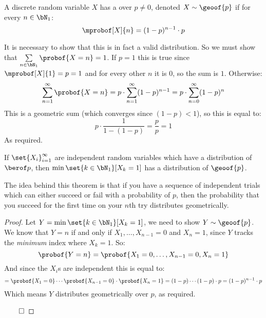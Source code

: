 \begin{defn*}

	A discrete random variable $X$ has a  over $p\neq0$,
	denoted $X\sim\geoof{p}$ if for every $n\in\bN_1$:
	\[ \mprobof[X]{n} = (1-p)^{n-1}\cdot p \]

\end{defn*}

\begin{note}

	It is necessary to show that this is in fact a valid distribution.
	So we must show that $\sum\limits_{n\in\bN_1}\probof{X=n}=1$.
	If $p=1$ this is true since $\mprobof[X]{1}=p=1$ and for every other $n$ it is $0$, so the sum is $1$.
	Otherwise:
	\[ \sum_{n=1}^\infty\probof{X=n} = p\cdot\sum_{n=1}^\infty(1-p)^{n-1} = p\cdot\sum_{n=0}^\infty(1-p)^n \]
	This is a geometric sum (which converges since $(1-p)<1$), so this is equal to:
	\[ p\cdot\frac{1}{1-(1-p)} = \frac pp = 1 \]
	As required.

\end{note}

\begin{thrm*}

	If $\set{X_i}_{i=1}^\infty$ are independent random variables which have a distribution of $\berof p$, then
	$\min\set{k\in\bN_1}[X_k=1]$ has a distribution of $\geoof{p}$.

\end{thrm*}

The idea behind this theorem is that if you have a sequence of independent trials which can either succeed or fail with a
probability of $p$, then the probability that you succeed for the first time on your $n$th try distributes geometrically.

\begin{proof}

	Let $Y=\min\set{k\in\bN_1}[X_k=1]$, we need to show $Y\sim\geoof{p}$.
	We know that $Y=n$ if and only if $X_1,\dots,X_{n-1}=0$ and $X_n=1$, since $Y$ tracks the \emph{minimum} index where
	$X_k=1$.
	So:
	\[ \probof{Y=n} = \probof{X_1=0,\dots,X_{n-1}=0, X_n=1} \]
	And since the $X_i$s are independent this is equal to:
	\[ = \probof{X_1=0}\cdots\probof{X_{n-1}=0}\cdot\probof{X_n=1} = (1-p)\cdots(1-p)\cdot p = (1-p)^{n-1}\cdot p \]
	Which means $Y$ distributes geometrically over $p$, as required.

	\hfill$\qed$

\end{proof}

